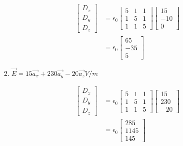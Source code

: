 \begin{problema}
\begin{enumerate}
\begin{sol}
        \begin{align*}
            \left[\begin{array}{l}
                D_{x} \\
                D_{y} \\
                D_{z}
                \end{array}\right]&=\epsilon_{0}\left[\begin{array}{lll}
                5 & 1 & 1 \\
                1 & 5 & 1 \\
                1 & 1 & 5
                \end{array}\right]\left[\begin{array}{l}
                15\\
                -10 \\
                0
                \end{array}\right]\\
                &=\epsilon_{0} \left[\begin{array}{l}
                    65\\
                    -35\\
                    5
                    \end{array}\right]
        \end{align*}
    \end{sol}
    \item $\vec{E}=15 \overrightarrow{a_{x}}+230 \overrightarrow{a_{y}}-20 \overrightarrow{a_{z}} V / m$
    \begin{sol}
        \begin{align*}
            \left[\begin{array}{l}
                D_{x} \\
                D_{y} \\
                D_{z}
                \end{array}\right]&=\epsilon_{0}\left[\begin{array}{lll}
                5 & 1 & 1 \\
                1 & 5 & 1 \\
                1 & 1 & 5
                \end{array}\right]\left[\begin{array}{l}
                15\\
                230 \\
                -20
                \end{array}\right]\\
                &=\epsilon_{0} \left[\begin{array}{l}
                    285\\
                    1145\\
                    145
                    \end{array}\right]
        \end{align*}
        
        
    \end{sol}
\end{enumerate}

\end{problema}


%
%

